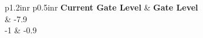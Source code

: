 \footnotesize
\begin{table}[!h]
\centering
\caption{Control strategy for S197 open (units are ft. NGVD29)}
\label{tab:CS-S197open}
\begin{tabular}{p{1.2in}{r} p{0.5in}{r}}
\hline
\textbf{Current Gate Level} & \textbf{Gate Level}\\
	& -7.9       \\
-1	& -0.9   \\
\hline
\end{tabular}
\end{table}
\normalsize

%
%
%

